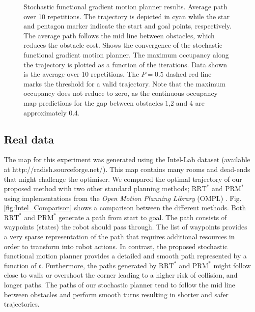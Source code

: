 \documentclass[letterpaper, 10 pt, conference]{ieeeconf}  %
\begin{document}
 \begin{figure}[!ht]
 \centering
 	\hspace{5pt}
 	\caption{Stochastic functional gradient motion planner results. \protect{} Average path over 10 repetitions. The trajectory is depicted in cyan while the star and pentagon marker indicate the start and goal points, respectively. The average path follows the mid line between obstacles, which reduces the obstacle cost. \protect{} Shows the convergence of the stochastic functional gradient motion planner. The maximum occupancy along the trajectory is plotted as a function of the iterations. Data shown is the average over 10 repetitions. The $P=0.5$ dashed red line marks the threshold for a valid trajectory. Note that the maximum occupancy does not reduce to zero, as the continuous occupancy map predictions for the gap between obstacles 1,2 and 4 are approximately 0.4.  }
 	\label{fig:GPPlanner_simulation}
 \end{figure}

\subsection{Real data}\label{subsec:real_data}

The map for this experiment was generated using the Intel-Lab dataset (available at http://radish.sourceforge.net/). This map contains many rooms and dead-ends that might challenge the optimiser. We compared the optimal trajectory of our proposed method with two other standard planning methods; $\text{RRT}^*$ \cite{karaman2010incremental} and $\text{PRM}^*$ \cite{Karaman2011} using implementations from the \textit{Open Motion Planning Library} (OMPL) \cite{sucan2012the-open-motion-planning-library}. Fig. \ref{fig:Intel_Comparison} shows a comparison between the different methods. Both $\text{RRT}^*$ and $\text{PRM}^*$ generate a path from start to goal. The path consists of waypoints (states) the robot should pass through. The list of waypoints provides a very sparse representation of the path that requires additional resources in order to transform into robot actions. In contrast, the proposed stochastic functional motion planner provides a detailed and smooth path represented by a function of $t$. Furthermore, the paths generated by $\text{RRT}^*$ and $\text{PRM}^*$ might follow close to walls or overshoot the corner leading to a higher risk of collision, and longer paths. The paths of our stochastic planner tend to follow the mid line between obstacles and perform smooth turns resulting in shorter and safer trajectories.  
\end{document}
